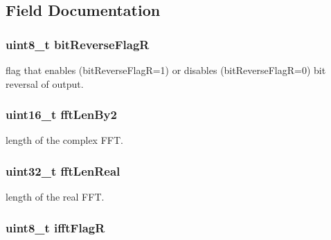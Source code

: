 \subsection{Field Documentation}
\hypertarget{structarm__rfft__instance__f32_ad56ec2425e2422108b8767b43d944591}{
\subsubsection[{bit\-Reverse\-Flag\-R}]{\setlength{\rightskip}{0pt plus 5cm}uint8\-\_\-t bit\-Reverse\-Flag\-R}}\label{structarm__rfft__instance__f32_ad56ec2425e2422108b8767b43d944591}
flag that enables (bit\-Reverse\-Flag\-R=1) or disables (bit\-Reverse\-Flag\-R=0) bit reversal of output. \hypertarget{structarm__rfft__instance__f32_a206b7cd92c35fde3432e5b9a0650c42c}{
\subsubsection[{fft\-Len\-By2}]{\setlength{\rightskip}{0pt plus 5cm}uint16\-\_\-t fft\-Len\-By2}}\label{structarm__rfft__instance__f32_a206b7cd92c35fde3432e5b9a0650c42c}
length of the complex F\-F\-T. \hypertarget{structarm__rfft__instance__f32_adf0d4604cf5546075d9d4cf122d6c986}{
\subsubsection[{fft\-Len\-Real}]{\setlength{\rightskip}{0pt plus 5cm}uint32\-\_\-t fft\-Len\-Real}}\label{structarm__rfft__instance__f32_adf0d4604cf5546075d9d4cf122d6c986}
length of the real F\-F\-T. \hypertarget{structarm__rfft__instance__f32_a787d72055c89e4d62b188d6bd646341c}{
\subsubsection[{ifft\-Flag\-R}]{\setlength{\rightskip}{0pt plus 5cm}uint8\-\_\-t ifft\-Flag\-R}}\label{structarm__rfft__instance__f32_a787d72055c89e4d62b188d6bd646341c}
